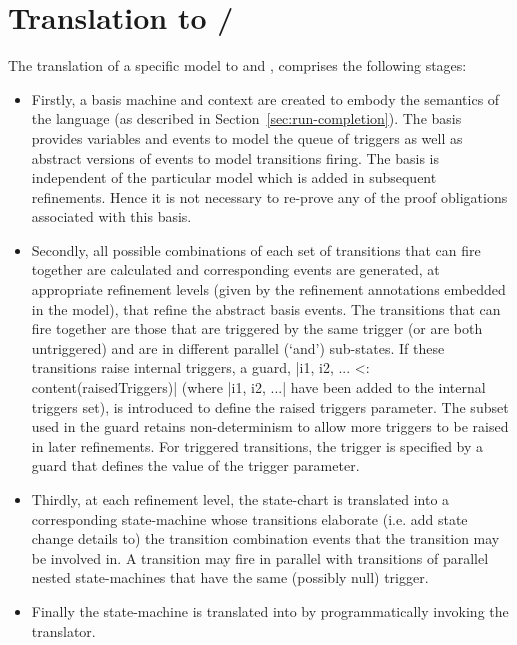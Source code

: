 
\section{\SCXML Translation to \UMLB/\EventB}
\label{sec:translation}

The translation of a specific \SCXML model to \UMLB and  \EventB, comprises the following stages: 
\begin{itemize}
	\item 
Firstly, a basis machine and context are created to embody the semantics of the \SCXML language (as described in Section~\ref{sec:run-completion}).
The basis provides variables and events to model the queue of triggers as well as abstract versions of events to model transitions firing.
The basis is independent of the particular \SCXML model which is added in subsequent refinements.
Hence it is not necessary to re-prove any of the proof obligations associated with this basis.
	\item 
Secondly, all possible combinations of each set of transitions that can fire together are calculated and corresponding events are generated, at appropriate refinement levels (given by the refinement annotations embedded in the \SCXML model), that refine the abstract basis events.
The transitions that can fire together are those that are triggered by the same trigger (or are both untriggered) and are in different parallel (`and') sub-states.
If these transitions raise internal triggers, a guard, |{i1, i2, ...} <: content(raisedTriggers)| (where |i1, i2, ...| have been added to the internal triggers set), is introduced to define the raised triggers parameter. 
The subset used in the guard retains non-determinism to allow more triggers to be raised in later refinements.
For triggered transitions, the trigger is specified by a guard that defines the value of the trigger parameter. 
	\item 
Thirdly, at each refinement level, the \SCXML state-chart is translated into a corresponding \UMLB state-machine whose transitions elaborate (i.e. add state change details to) the transition combination events that the transition may be involved in.
A transition may fire in parallel with transitions of parallel nested state-machines that have the same (possibly null) trigger.
	\item
Finally the \UMLB state-machine is translated into \EVENTB by programmatically invoking the \UMLB translator.
\end{itemize}

